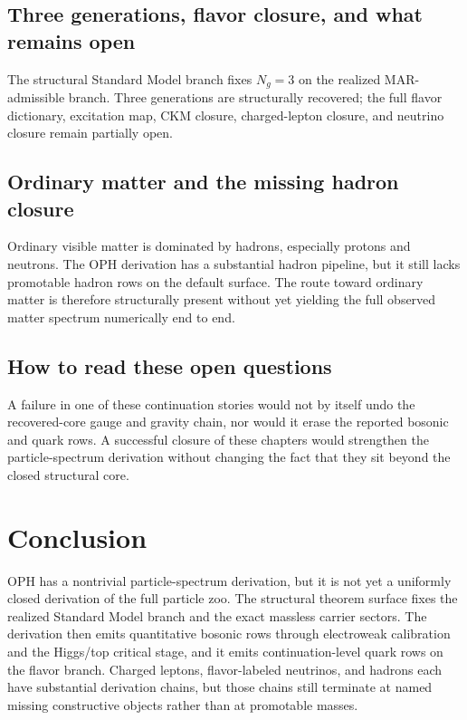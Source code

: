 \documentclass[11pt]{article}
\begin{document}
\subsection{Three generations, flavor closure, and what remains open}

The structural Standard Model branch fixes \(N_g=3\) on the realized MAR-admissible
branch. Three generations are structurally recovered; the full flavor dictionary,
excitation map, CKM closure, charged-lepton closure, and neutrino closure remain partially open.

\subsection{Ordinary matter and the missing hadron closure}

Ordinary visible matter is dominated by hadrons, especially protons and neutrons. The OPH
derivation has a substantial hadron pipeline, but it still lacks promotable hadron rows on the
default surface. The route toward ordinary matter is therefore structurally present without yet
yielding the full observed matter spectrum numerically end to end.

\subsection{How to read these open questions}

A failure in one of these continuation stories would not by itself undo the
recovered-core gauge and gravity chain, nor would it erase the reported bosonic and quark
rows. A successful closure of these chapters would strengthen the particle-spectrum derivation
without changing the fact that they sit beyond the closed structural core.

\section{Conclusion}

OPH has a nontrivial particle-spectrum derivation, but it is not
yet a uniformly closed derivation of the full particle zoo. The structural theorem surface fixes
the realized Standard Model branch and the exact massless carrier sectors. The derivation
then emits quantitative bosonic rows through electroweak calibration and the Higgs/top critical
stage, and it emits continuation-level quark rows on the flavor branch. Charged leptons,
flavor-labeled neutrinos, and hadrons each have substantial derivation chains, but those chains still
terminate at named missing constructive objects rather than at promotable masses.
\end{document}
